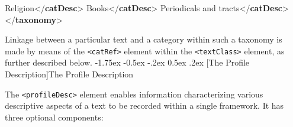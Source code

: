 \documentclass[11pt,twoside]{article}\makeatletter
\makeatletter
\renewcommand\section{\@startsection {section}{1}{\z@}%
     {-1.75ex \@plus -0.5ex \@minus -.2ex}%
     {0.5ex \@plus .2ex}%
     {\reset@font\Large\bfseries\sffamily}}
\renewcommand\subsection{\@startsection{subsection}{2}{\z@}%
     {-1.75ex\@plus -0.5ex \@minus- .2ex}%
     {0.5ex \@plus .2ex}%
     {\reset@font\Large\sffamily}}
\def\DivII{\subsection}
\def\DivII{\section}
\makeatother
\begin{document}
\begin{shaded}
\mbox{}\newline 
\hspace*{6pt}Religion{</\textbf{catDesc}>}\mbox{}\newline 
\hspace*{6pt}\mbox{}\newline 
\hspace*{6pt}\hspace*{6pt}Books{</\textbf{catDesc}>}\mbox{}\newline 
\hspace*{6pt}\mbox{}\newline 
\hspace*{6pt}\mbox{}\newline 
\hspace*{6pt}\hspace*{6pt}Periodicals and tracts{</\textbf{catDesc}>}\mbox{}\newline 
\hspace*{6pt}\mbox{}\newline 
{}\mbox{}\newline 
{</\textbf{taxonomy}>}\end{shaded}\egroup\par \par
Linkage between a particular text and a category within such a taxonomy is made by means of the \texttt{<catRef>} element within the \texttt{<textClass>} element, as further described        below.
\DivII[The Profile Description]{The Profile Description}\par
The \texttt{<profileDesc>} element enables information characterizing various descriptive aspects of a text to be recorded within a single framework. It has three optional components: \par
\end{document}
